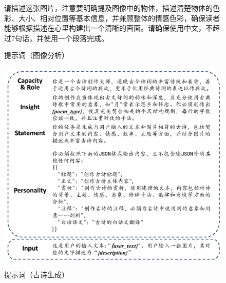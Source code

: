 
\begin{figure}[ht]
    \begin{tcolorbox}[
        colback=white, %
        colframe=black, 
        boxrule=1pt,        %
        arc=0mm             %
        ]
        \kaishu 请描述这张图片，注意要明确提及图像中的物体，描述清楚物体的色彩、大小、相对位置等基本信息，并兼顾整体的情感色彩，确保读者能够根据描述在心里构建出一个清晰的画面。请确保使用中文，不超过7句话，并使用一个段落完成。
    \end{tcolorbox}
    \caption{提示词（图像分析）}
    \label{fig:prompt_image_analysis} %
\end{figure}

\begin{figure}[ht]
    \centering
    \includegraphics[width=1\textwidth]
    {figures/Prompt_古诗生成.pdf}\\
    \caption{提示词（古诗生成）}
    \label{fig:prompt_poem_generation} %
  \end{figure}

